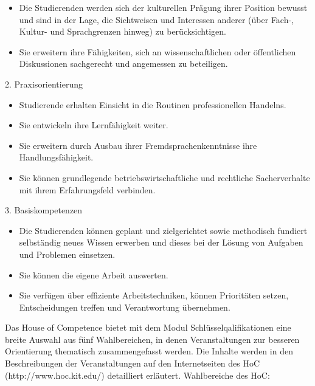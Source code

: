 \begin{module}
\begin{learningoutcomes}
 \begin{itemize}\item Die Studierenden werden sich der kulturellen Prägung ihrer Position bewusst und sind in der Lage, die Sichtweisen und Interessen anderer (über Fach-, Kultur- und Sprachgrenzen hinweg) zu berücksichtigen.  \item Sie erweitern ihre Fähigkeiten, sich an wissenschaftlichen oder öffentlichen Diskussionen sachgerecht und angemessen zu beteiligen.  \end{itemize}

2. Praxisorientierung

 \begin{itemize}\item Studierende erhalten Einsicht in die Routinen professionellen Handelns.  \item Sie entwickeln ihre Lernfähigkeit weiter.  \item Sie erweitern durch Ausbau ihrer Fremdsprachenkenntnisse ihre Handlungsfähigkeit.  \item Sie können grundlegende betriebswirtschaftliche und rechtliche Sacherverhalte mit ihrem Erfahrungsfeld verbinden.  \end{itemize}

3. Basiskompetenzen

 \begin{itemize}\item Die Studierenden können geplant und zielgerichtet sowie methodisch fundiert selbständig neues Wissen erwerben und dieses bei der Lösung von Aufgaben und Problemen einsetzen.  \item Sie können die eigene Arbeit auswerten.  \item Sie verfügen über effiziente Arbeitstechniken, können Prioritäten setzen, Entscheidungen treffen und Verantwortung übernehmen.  \end{itemize}
\end{learningoutcomes}

\begin{content}
Das House of Competence bietet mit dem Modul Schlüsselqalifikationen eine breite Auswahl aus fünf Wahlbereichen, in denen Veranstaltungen zur besseren Orientierung thematisch zusammengefasst werden. Die Inhalte werden in den Beschreibungen der Veranstaltungen auf den Internetseiten des HoC (http://www.hoc.kit.edu/) detailliert erläutert.\newline
\newline
Wahlbereiche des HoC:


\end{content}
\end{module}
